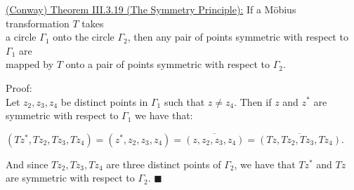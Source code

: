\documentclass{book}
\newcommand{\exTwo}{%
   \color{Purple}%
   \fontsize{13}{15}\selectfont%
}
\newcommand{\exThreeP}{%
   \color{RedViolet}%
   \fontsize{12}{14}\selectfont%
}
\newenvironment{myIndent}{%
   \begin{adjustwidth}{2.5em}{0em}%
}{%
   \end{adjustwidth}%
}
\newcommand{\retTwo}{\hfill\bigbreak}
\begin{document}
\exTwo\ul{(Conway) Theorem III.3.19 (The Symmetry Principle):} If a Möbius transformation $T$ takes\\ a circle $\Gamma_1$ onto the circle $\Gamma_2$, then any pair of points symmetric with respect to $\Gamma_1$ are\\ mapped by $T$ onto a pair of points symmetric with respect to $\Gamma_2$.

\begin{myIndent}\exThreeP
	Proof:\\
	Let $z_2, z_3, z_4$ be distinct points in $\Gamma_1$ such that $z \neq z_4$. Then if $z$ and $z^{*}$ are symmetric with respect to $\Gamma_1$ we have that: 

	{\centering $(Tz^*, Tz_2, Tz_3, Tz_4) = (z^*, z_2, z_3, z_4) = \overline{(z, z_2, z_3, z_4)} = \overline{(Tz, Tz_2, Tz_3, Tz_4)}$. \retTwo\par}

	And since $Tz_2, Tz_3, Tz_4$ are three distinct points of $\Gamma_2$, we have that $Tz^*$ and $Tz$ are symmetric with respect to $\Gamma_2$. $\blacksquare$\retTwo
\end{myIndent}
\end{document}
